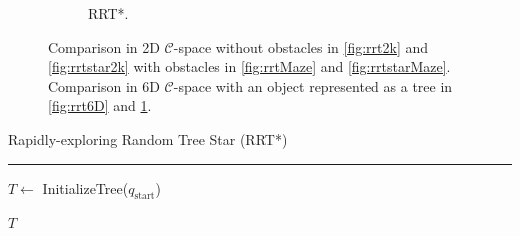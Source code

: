\documentclass{ctuthesis}
\begin{document}
\begin{figure}[!ht]
\begin{subfigure}[b]{0.45\textwidth}
      \caption{RRT*.}
      \label{fig:rrtstar6D}
  \end{subfigure} 
  \caption{Comparison in 2D $\mathcal{C}$-space without obstacles in \ref{fig:rrt2k} 
  and \ref{fig:rrtstar2k} with obstacles in \ref{fig:rrtMaze} and \ref{fig:rrtstarMaze}.
  Comparison in 6D $\mathcal{C}$-space with an object represented as a tree in \ref{fig:rrt6D} and \ref{fig:rrtstar6D}.}
  \label{fig:RRTvsRRTstar}
\end{figure}
\begin{algorithm}[H]
  \caption{Rapidly-exploring Random Tree Star (RRT*)}
  \label{alg:rrt_star}
  
  \vspace{0.1cm}
  \hrule
  \vspace{0.2cm}
  $T \leftarrow$ InitializeTree($q_{\text{start}}$)\;
  

  \Return $T$\; 
\end{algorithm} 

\clearpage 
\end{document}
